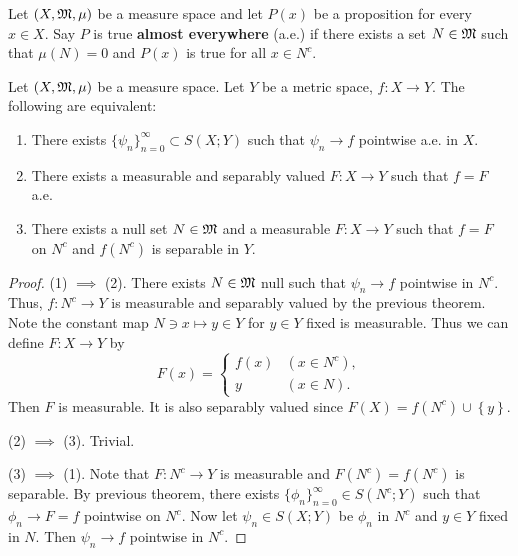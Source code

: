 \documentclass[a4paper]{article}
\renewcommand{\seqinfn}[1]{\{ #1 \}_{n=0}^\infty}
\begin{document}
\begin{defi}

Let $(X, \mathfrak{M}, \mu)$ be a measure space and let
$P(x)$ be a proposition for every $x \in X$. Say
$P$ is true \textbf{almost everywhere} (a.e.) if there exists
a set $N \in \mathfrak{M}$ such that $\mu(N) = 0$ and
$P(x)$ is true for all $x \in N^c$.

\end{defi}

\begin{thm}
  Let $(X, \mathfrak{M}, \mu)$ be a measure space. Let $Y$ be a
  metric space, $f: X \to Y$. The following are equivalent:
  \begin{enumerate}
    \item There exists $\seqinfn{\psi_n} \subset S(X; Y)$
    such that $\psi_n \to f$ pointwise a.e. in $X$.
    \item There exists a measurable and separably valued
    $F : X \to Y$ such that $f = F$ a.e.
    \item There exists a null set $N \in \mathfrak{M}$ and a
    measurable $F: X \to Y$ such that $f = F$
    on $N^c$ and $f(N^c)$ is separable in
    $Y$.
  \end{enumerate}
\end{thm}

\begin{proof}

(1) $\implies$ (2). There exists $N \in \mathfrak{M}$ null such that
$\psi_n \to f$ pointwise in $N^c$. Thus,
$f: N^c \to Y$ is measurable and separably valued
by the previous theorem. Note the constant map
$N \ni x \mapsto y \in Y$ for $y \in Y$ fixed is measurable.
Thus we can define $F : X \to Y$ by
\[
F(x) = \begin{cases}
  f(x) & (x \in N^c), \\
  y & (x \in N).
\end{cases}
\]
Then $F$ is measurable. It is also separably valued
since $F(X) = f(N^c) \cup \left\{ y \right\}$.

(2) $\implies$ (3). Trivial.

(3) $\implies$ (1). Note that $F: N^c \to Y$ is measurable
and $F(N^c) = f(N^c)$ is separable.
By previous theorem, there exists $\seqinfn{\phi_n} \in S(N^c;
Y)$ such that $\phi_n \to F = f$
pointwise on $N^c$.
Now let $\psi_n \in S(X; Y)$ be $\phi_n$ in $N^c$
and $y \in Y$ fixed in $N$. Then $\psi_n \to f$ pointwise
in $N^c$.

\end{proof}
\end{document}
